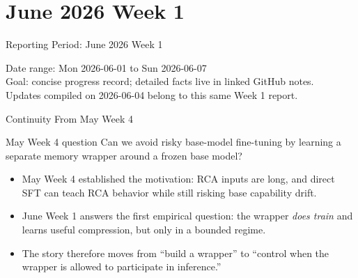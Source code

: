 
\section{June 2026 Week 1}

\begin{frame}{Reporting Period: June 2026 Week 1}
  \begin{center}
    \small Date range: Mon 2026-06-01 to Sun 2026-06-07 \\
    \scriptsize Goal: concise progress record; detailed facts live in linked GitHub notes. \\
    \scriptsize Updates compiled on 2026-06-04 belong to this same Week 1 report.
  \end{center}
\end{frame}

\begin{frame}{Continuity From May Week 4}
  \begin{block}{May Week 4 question}
    Can we avoid risky base-model fine-tuning by learning a separate memory
    wrapper around a frozen base model?
  \end{block}
  \begin{itemize}
    \item May Week 4 established the motivation: RCA inputs are long, and direct
      SFT can teach RCA behavior while still risking base capability drift.
    \item June Week 1 answers the first empirical question: the wrapper
      \emph{does train} and learns useful compression, but only in a bounded
      regime.
    \item The story therefore moves from ``build a wrapper'' to ``control when
      the wrapper is allowed to participate in inference.''
  \end{itemize}
\end{frame}

